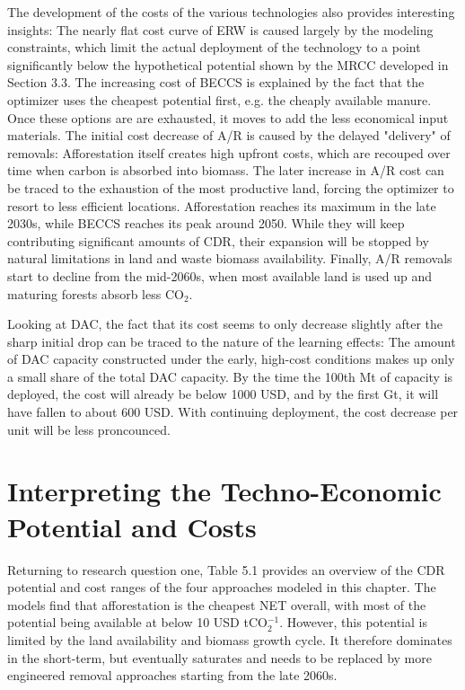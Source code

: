 The development of the costs of the various technologies also provides interesting insights: The nearly flat cost curve of ERW is caused largely by the modeling constraints, which limit the actual deployment of the technology to a point significantly below the hypothetical potential shown by the MRCC developed in Section 3.3. The increasing cost of BECCS is explained by the fact that the optimizer uses the cheapest potential first, e.g. the cheaply available manure. Once these options are are exhausted, it moves to add the less economical input materials. The initial cost decrease of A/R is caused by the delayed "delivery" of removals: Afforestation itself creates high upfront costs, which are recouped over time when carbon is absorbed into biomass. The later increase in A/R cost can be traced to the exhaustion of the most productive land, forcing the optimizer to resort to less efficient locations. Afforestation reaches its maximum in the late 2030s, while BECCS reaches its peak around 2050. While they will keep contributing significant amounts of CDR, their expansion will be stopped by natural limitations in land and waste biomass availability. Finally, A/R removals start to decline from the mid-2060s, when most available land is used up and maturing forests absorb less CO$_2$.\vspace{2mm}

Looking at DAC, the fact that its cost seems to only decrease slightly after the sharp initial drop can be traced to the nature of the learning effects: The amount of DAC capacity constructed under the early, high-cost conditions makes up only a small share of the total DAC capacity. By the time the 100th Mt of capacity is deployed, the cost will already be below 1000 USD, and by the first Gt, it will have fallen to about 600 USD. With continuing deployment, the cost decrease per unit will be less proncounced.\vspace{2mm}

\section{Interpreting the Techno-Economic Potential and Costs}
Returning to research question one, Table 5.1 provides an overview of the CDR potential and cost ranges of the four approaches modeled in this chapter. The models find that afforestation is the cheapest NET overall, with most of the potential being available at below 10 USD tCO$_2^{-1}$. However, this potential is limited by the land availability and biomass growth cycle. It therefore dominates in the short-term, but eventually saturates and needs to be replaced by more engineered removal approaches starting from the late 2060s.\vspace{2mm}

